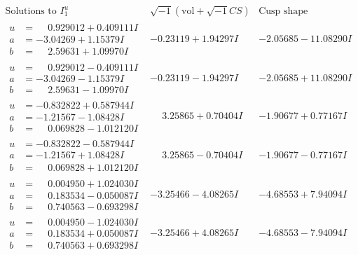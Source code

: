 \documentclass[1p]{elsarticle_modified}
\theoremstyle{definition}
\newcommand{\I}{\sqrt{-1}}
\begin{document}
$$\begin{array}{c|c|c}  
\text{Solutions to }I^u_{1}& \I (\text{vol} + \sqrt{-1}CS) & \text{Cusp shape}\\
 \hline 
\begin{aligned}
u &= \phantom{-}0.929012 + 0.409111 I \\
a &= -3.04269 + 1.15379 I \\
b &= \phantom{-}2.59631 + 1.09970 I\end{aligned}
 & -0.23119 + 1.94297 I & -2.05685 - 11.08290 I \\ \hline\begin{aligned}
u &= \phantom{-}0.929012 - 0.409111 I \\
a &= -3.04269 - 1.15379 I \\
b &= \phantom{-}2.59631 - 1.09970 I\end{aligned}
 & -0.23119 - 1.94297 I & -2.05685 + 11.08290 I \\ \hline\begin{aligned}
u &= -0.832822 + 0.587944 I \\
a &= -1.21567 - 1.08428 I \\
b &= \phantom{-}0.069828 - 1.012120 I\end{aligned}
 & \phantom{-}3.25865 + 0.70404 I & -1.90677 + 0.77167 I \\ \hline\begin{aligned}
u &= -0.832822 - 0.587944 I \\
a &= -1.21567 + 1.08428 I \\
b &= \phantom{-}0.069828 + 1.012120 I\end{aligned}
 & \phantom{-}3.25865 - 0.70404 I & -1.90677 - 0.77167 I \\ \hline\begin{aligned}
u &= \phantom{-}0.004950 + 1.024030 I \\
a &= \phantom{-}0.183534 - 0.050087 I \\
b &= \phantom{-}0.740563 - 0.693298 I\end{aligned}
 & -3.25466 - 4.08265 I & -4.68553 + 7.94094 I \\ \hline\begin{aligned}
u &= \phantom{-}0.004950 - 1.024030 I \\
a &= \phantom{-}0.183534 + 0.050087 I \\
b &= \phantom{-}0.740563 + 0.693298 I\end{aligned}
 & -3.25466 + 4.08265 I & -4.68553 - 7.94094 I \\ \hline\begin{aligned}

\end{aligned}
\end{array}$$
\end{document}
